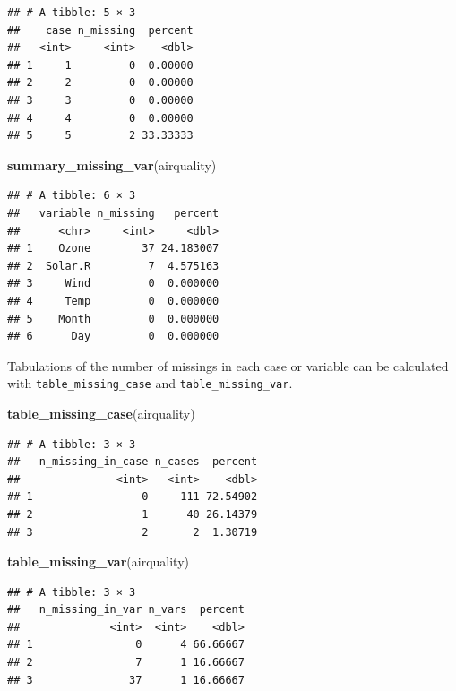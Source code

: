 \documentclass[]{article}
\newenvironment{Shaded}{\begin{snugshade}}{\end{snugshade}}
\newcommand{\KeywordTok}[1]{\textcolor[rgb]{0.13,0.29,0.53}{\textbf{{#1}}}}
\newcommand{\NormalTok}[1]{{#1}}
\begin{document}
\begin{verbatim}
## # A tibble: 5 × 3
##    case n_missing  percent
##   <int>     <int>    <dbl>
## 1     1         0  0.00000
## 2     2         0  0.00000
## 3     3         0  0.00000
## 4     4         0  0.00000
## 5     5         2 33.33333
\end{verbatim}

\begin{Shaded}
\begin{Highlighting}[]
\KeywordTok{summary_missing_var}\NormalTok{(airquality)}
\end{Highlighting}
\end{Shaded}

\begin{verbatim}
## # A tibble: 6 × 3
##   variable n_missing   percent
##      <chr>     <int>     <dbl>
## 1    Ozone        37 24.183007
## 2  Solar.R         7  4.575163
## 3     Wind         0  0.000000
## 4     Temp         0  0.000000
## 5    Month         0  0.000000
## 6      Day         0  0.000000
\end{verbatim}

Tabulations of the number of missings in each case or variable can be
calculated with \texttt{table\_missing\_case} and
\texttt{table\_missing\_var}.

\begin{Shaded}
\begin{Highlighting}[]
\KeywordTok{table_missing_case}\NormalTok{(airquality)}
\end{Highlighting}
\end{Shaded}

\begin{verbatim}
## # A tibble: 3 × 3
##   n_missing_in_case n_cases  percent
##               <int>   <int>    <dbl>
## 1                 0     111 72.54902
## 2                 1      40 26.14379
## 3                 2       2  1.30719
\end{verbatim}

\begin{Shaded}
\begin{Highlighting}[]
\KeywordTok{table_missing_var}\NormalTok{(airquality)}
\end{Highlighting}
\end{Shaded}

\begin{verbatim}
## # A tibble: 3 × 3
##   n_missing_in_var n_vars  percent
##              <int>  <int>    <dbl>
## 1                0      4 66.66667
## 2                7      1 16.66667
## 3               37      1 16.66667
\end{verbatim}
\end{document}
